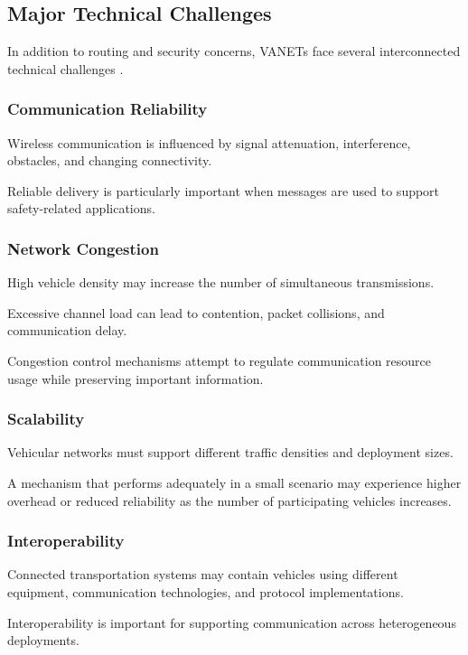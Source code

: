 \subsection{Major Technical Challenges}
\label{sec:3c}

In addition to routing
and security concerns,
VANETs face several
interconnected
technical challenges
\cite{Hartenstein2008,Karagiannis2011}.

\subsubsection{Communication Reliability}

Wireless communication
is influenced by
signal attenuation,
interference,
obstacles, and
changing connectivity.

Reliable delivery
is particularly
important when
messages are used
to support
safety-related
applications.

\subsubsection{Network Congestion}

High vehicle density
may increase
the number of
simultaneous
transmissions.

Excessive channel
load can lead
to contention,
packet collisions,
and communication
delay.

Congestion control
mechanisms attempt
to regulate
communication
resource usage
while preserving
important information.

\subsubsection{Scalability}

Vehicular networks
must support
different traffic
densities and
deployment sizes.

A mechanism that
performs adequately
in a small scenario
may experience
higher overhead
or reduced
reliability
as the number
of participating
vehicles increases.

\subsubsection{Interoperability}

Connected transportation
systems may contain
vehicles using
different equipment,
communication
technologies,
and protocol
implementations.

Interoperability
is important for
supporting
communication
across heterogeneous
deployments.

